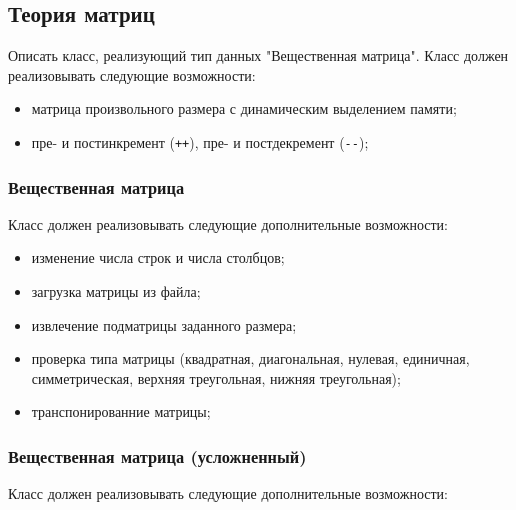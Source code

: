 \documentclass[a4paper,12pt]{article}
\begin{document}
\subsection{Теория матриц}

Описать класс, реализующий тип данных "Вещественная матрица".  Класс
должен реализовывать следующие возможности:

\begin{itemize}
\item матрица произвольного размера с динамическим выделением памяти;
\item пре- и постинкремент (\lstinline|++|), пре- и постдекремент
  (\lstinline|--|);
\end{itemize}

\subsubsection{Вещественная матрица}

Класс должен реализовывать следующие дополнительные возможности:

\begin{itemize}
\item изменение числа строк и числа столбцов;
\item загрузка матрицы из файла;
\item извлечение подматрицы заданного размера;
\item проверка типа матрицы (квадратная, диагональная, нулевая,
  единичная, симметрическая, верхняя треугольная, нижняя треугольная);
\item транспонированние матрицы;
\end{itemize}

\subsubsection{Вещественная матрица (усложненный)}

Класс должен реализовывать следующие дополнительные возможности:
\end{document}
